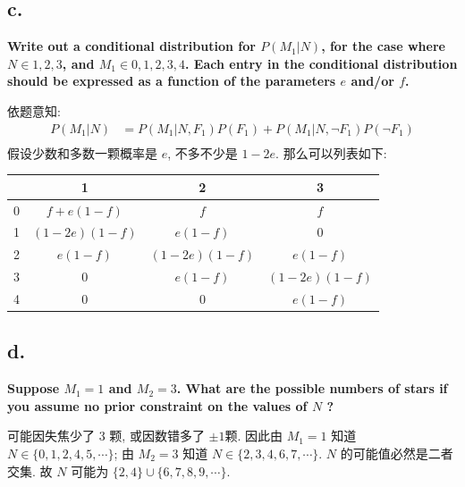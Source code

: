 \documentclass[UTF8]{article}
\newcommand{\jumpLine} {\hspace*{\fill} \par}
\begin{document}
\subsection*{c.}
\noindent \textbf{Write out a conditional distribution for $P(M_1|N)$, for the case where $N\in 1,2,3$, and  $M_1\in 0,1,2,3,4$. Each entry in the conditional distribution should be expressed as a function of the parameters $e$ and/or $f$.} \\\jumpLine\noindent
依题意知: 
\begin{align*}
	P(M_1|N) &= P(M_1|N,F_1)P(F_1) + P(M_1|N,\lnot F_1)P(\lnot F_1) \\
\end{align*}
假设少数和多数一颗概率是 $e$, 不多不少是 $1-2e$. 那么可以列表如下:
\begin{center}
	\begin{tabular}{|c|c|c|c|}
		\hline
		\diagbox{$M_1$}{$N$} & 1 & 2 & 3  \\
		\hline
		0 & $f + e(1-f)$ & $f$ & $f$ \\
		\hline
		1 & $(1-2e)(1-f)$ & $e(1-f)$ & $0$ \\
		\hline
		2 & $e(1-f)$ & $(1-2e)(1-f)$ & $e(1-f)$ \\
		\hline
		3 & $0$ & $e(1-f)$ & $(1-2e)(1-f)$ \\
		\hline
		4 & $0$ & $0$ & $e(1-f)$ \\
		\hline
	\end{tabular}
\end{center}

\subsection*{d.}
\noindent \textbf{Suppose $M_1=1$ and $M_2=3$. What are the possible numbers of stars if you assume no prior constraint on the values of $N$ ?} \\\jumpLine\noindent
可能因失焦少了 3 颗, 或因数错多了 $\pm 1$颗. 因此由 $M_1=1$ 知道 $N \in \{0,1,2,4,5,\cdots\}$; 由 $M_2=3$ 知道 $N \in \{2,3,4,6,7,\cdots\}$. $N$ 的可能值必然是二者交集. 故 $N$ 可能为 $\{2,4\}\cup \{6,7,8,9,\cdots\}$.
\end{document}
